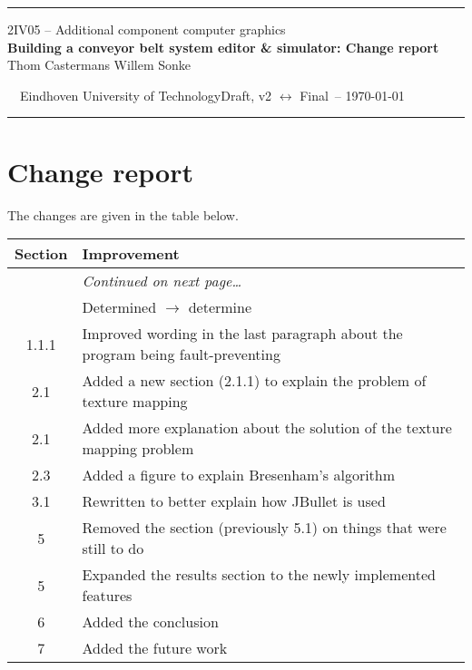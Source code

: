 \documentclass[a4paper,10pt]{article}
\newcommand*{\accgtitle}{Building a conveyor belt system editor \& simulator: Change report\xspace}
\newcommand*{\accgversion}{Draft, v2 $\leftrightarrow$ Final\xspace}
\begin{document}
\begin{adjustwidth}{0.05\textwidth}{0.05\textwidth}  
  \textcolor{accgblue}{\rule{0.9\textwidth}{0.8pt}}
  
  \begin{center}
    \large 2IV05 -- Additional component computer graphics\\
    \Large\textbf{\accgtitle}\\[10pt]
    \normalsize Thom Castermans \qquad Willem Sonke
  \end{center}
  
  \vspace{10pt}\noindent\footnotesize~~Eindhoven University of Technology\hfill\accgversion\ -- \today~~
  
  \vspace{-6pt}\noindent\textcolor{accgblue}{\rule{0.9\textwidth}{0.8pt}}
\end{adjustwidth}

\begin{abstract}
 This document details the changes between the second draft version of the report and the final version.
\end{abstract}

\section*{Change report}
The changes are given in the table below.

\begin{longtabu}{cX<{\strut}}
  \toprule
  \textbf{Section} & \textbf{Improvement} \\
  \midrule
  \endhead
  \bottomrule
  & \vspace*{-5pt}\hfill\textit{Continued on next page\ldots} \\
  \endfoot
  \bottomrule
   & Determined $\rightarrow$ determine \\
  1.1.1 & Improved wording in the last paragraph about the program being fault-preventing \\
  2.1 & Added a new section (2.1.1) to explain the problem of texture mapping \\
  2.1 & Added more explanation about the solution of the texture mapping problem \\
  2.3 & Added a figure to explain Bresenham's algorithm \\
  3.1 & Rewritten to better explain how JBullet is used \\
  5 & Removed the section (previously 5.1) on things that were still to do \\
  5 & Expanded the results section to the newly implemented features \\
  6 & Added the conclusion \\
  7 & Added the future work \\
\end{longtabu}
\end{document}

